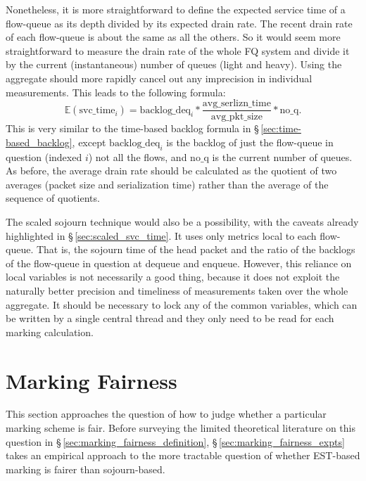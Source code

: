 Nonetheless, it is more straightforward to define the expected service time of a flow-queue as its depth divided by its expected drain rate. The recent drain rate of each flow-queue is about the same as all the others. So it would seem more straightforward to measure the drain rate of the whole FQ system and divide it by the current (instantaneous) number of queues (light and heavy). Using the aggregate should more rapidly cancel out any imprecision in individual measurements. This leads to the following formula:
\[\mathbb{E}(\mathrm{svc\_time}_i) = \mathrm{backlog\_deq}_i * \frac{\mathrm{avg\_serlizn\_time}}{\mathrm{avg\_pkt\_size}} * \mathrm{no\_q}.\]
This is very similar to the time-based backlog formula in \S\,\ref{sec:time-based_backlog}, except \(\mathrm{backlog\_deq}_i\) is the backlog of just the flow-queue in question (indexed \(i\)) not all the flows, and \(\mathrm{no\_q}\) is the current number of queues. As before, the average drain rate should be calculated as the quotient of two averages (packet size and serialization time) rather than the average of the sequence of quotients.

The scaled sojourn technique would also be a possibility, with the caveats already highlighted in \S\,\ref{sec:scaled_svc_time}. It uses only metrics local to each flow-queue. That is, the sojourn time of the head packet and the ratio of the backlogs of the flow-queue in question at dequeue and enqueue. However, this reliance on local variables is not necessarily a good thing, because it does not exploit the naturally better precision and timeliness of measurements taken over the whole aggregate. It should be necessary to lock any of the common variables, which can be written by a single central thread and they only need to be read for each marking calculation.

\section{Marking Fairness}\label{sec:marking_fairness_discuss}

This section approaches the question of how to judge whether a particular marking scheme is fair. Before surveying the limited theoretical literature on this question in \S\,\ref{sec:marking_fairness_definition}, \S\,\ref{sec:marking_fairness_expts} takes an empirical approach to the more tractable question of whether EST-based marking is fairer than sojourn-based. 

